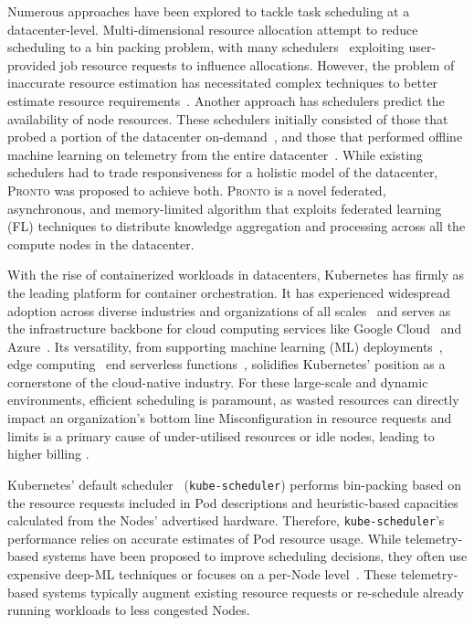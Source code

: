 Numerous approaches have been explored to tackle task scheduling at a
datacenter-level. Multi-dimensional resource allocation attempt to reduce
scheduling to a bin packing problem, with many schedulers~\cite{verma2015large,
ungureanu2019kubernetes}
exploiting user-provided job resource requests to influence allocations.
However, the problem of inaccurate resource estimation has necessitated complex
techniques to better estimate resource requirements~\cite{delimitrou2014quasar, grandl2016altruistic, venkataraman2016ernest}. Another approach
has schedulers predict the availability of node resources. These schedulers
initially consisted of those that probed a portion of the datacenter
on-demand~\cite{ousterhout2013sparrow}, and those that performed offline machine learning on
telemetry from the entire datacenter~\cite{cortez2017resource}. While existing schedulers had to
trade responsiveness for a holistic model of the datacenter, \textsc{Pronto} was
proposed to achieve both. \textsc{Pronto} is a novel federated, asynchronous,
and memory-limited algorithm that exploits federated learning (FL) techniques to
distribute knowledge aggregation and processing across all the compute nodes in
the datacenter.

With the rise of containerized workloads in datacenters, Kubernetes has firmly
as the leading platform for container orchestration. It has experienced
widespread adoption across diverse industries and organizations of all
scales~\cite{kubernetes-adoption-statistics} and serves as the infrastructure
backbone for cloud computing services like Google Cloud~\cite{google-gke} and
Azure~\cite{azure-aks}. Its versatility, from supporting machine learning (ML)
deployments~\cite{kubernetes-ai}, edge computing~\cite{cloudraft} end serverless
functions~\cite{knative, openwhisk}, solidifies Kubernetes' position as a
cornerstone of the cloud-native industry. For these large-scale and dynamic
environments, efficient scheduling is paramount, as wasted resources can
directly impact an organization's bottom line Misconfiguration in resource
requests and limits is a primary cause of under-utilised resources or idle
nodes, leading to higher billing \cite{cost-strategies,
bin-packing-and-cost-savings-in-kubernetes-clusters-on-aws}.

Kubernetes' default scheduler~\cite{kube-scheduler} (\texttt{kube-scheduler})
performs bin-packing based on the resource requests included in Pod descriptions
and heuristic-based capacities calculated from the Nodes' advertised hardware.
Therefore, \texttt{kube-scheduler}'s performance relies on accurate estimates
of Pod resource usage. While telemetry-based systems have been proposed to
improve scheduling decisions, they often use expensive deep-ML techniques
\cite{bao2019deep, peng2021dl2} or focuses on a per-Node
level~\cite{yang2019design}. These telemetry-based systems typically augment
existing resource requests or re-schedule already running workloads to less
congested Nodes.

